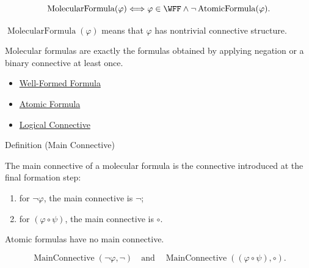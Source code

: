 \begin{remark*}
\[
\operatorname{MolecularFormula}(\varphi)
\Longleftrightarrow
\varphi\in\WFF\land\neg \operatorname{AtomicFormula}(\varphi).
\]
\end{remark*}

\begin{remark*}
\(\operatorname{MolecularFormula}(\varphi)\) means that \(\varphi\) has nontrivial connective structure.
\end{remark*}

\begin{remark*}[Interpretation]
Molecular formulas are exactly the formulas obtained by applying negation or a binary connective at least once.
\end{remark*}

\begin{dependencies}
\begin{itemize}
  \item \hyperref[def:well-formed-formula]{Well-Formed Formula}
  \item \hyperref[def:atomic-formula-propositional-logic]{Atomic Formula}
  \item \hyperref[def:logical-connective]{Logical Connective}
\end{itemize}
\end{dependencies}
\begin{definitionbox}{Definition (Main Connective)}
\begin{definition}
\label{def:main-connective-propositional-logic}
The main connective of a molecular formula is the connective introduced at the final formation step:
\begin{enumerate}
\item for \(\neg\varphi\), the main connective is \(\neg\);
\item for \((\varphi\circ\psi)\), the main connective is \(\circ\).
\end{enumerate}
Atomic formulas have no main connective.
\end{definition}
\end{definitionbox}

\begin{remark*}
\[
\operatorname{MainConnective}(\neg\varphi,\neg)
\quad\text{and}\quad
\operatorname{MainConnective}((\varphi\circ\psi),\circ).
\]
\end{remark*}

